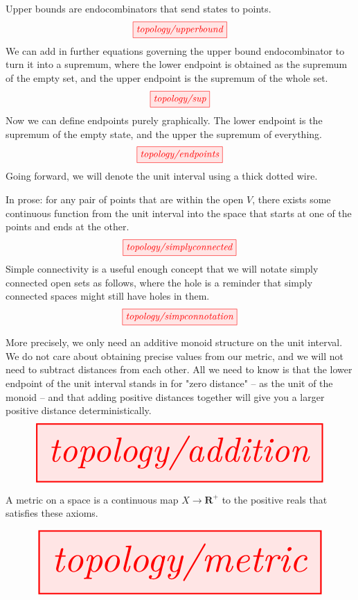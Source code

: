 \begin{myboxR}
\begin{defn}\label{defn:bounds}
Upper bounds are endocombinators that send states to points.
\[\tikzfig{topology/upperbound}\]
We can add in further equations governing the upper bound endocombinator to turn it into a supremum, where the lower endpoint is obtained as the supremum of the empty set, and the upper endpoint is the supremum of the whole set.
\[\tikzfig{topology/sup}\]
Now we can define endpoints purely graphically. The lower endpoint is the supremum of the empty state, and the upper the supremum of everything.
\[\tikzfig{topology/endpoints}\]
Going forward, we will denote the unit interval using a thick dotted wire.
\end{defn}
\end{myboxR}

\begin{myboxB}
\begin{defn}\label{def:simpconn}
In prose: for any pair of points that are within the open $V$, there exists some continuous function from the unit interval into the space that starts at one of the points and ends at the other.
\[\tikzfig{topology/simplyconnected}\]
Simple connectivity is a useful enough concept that we will notate simply connected open sets as follows, where the hole is a reminder that simply connected spaces might still have holes in them.
\[\tikzfig{topology/simpconnotation}\]
\end{defn}
\end{myboxB}

\begin{myboxR}
\begin{defn}[Addition]\label{def:addition}
More precisely, we only need an additive monoid structure on the unit interval. We do not care about obtaining precise values from our metric, and we will not need to subtract distances from each other. All we need to know is that the lower endpoint of the unit interval stands in for "zero distance" -- as the unit of the monoid -- and that adding positive distances together will give you a larger positive distance deterministically.
\[\resizebox{\textwidth}{!}{\tikzfig{topology/addition}}\]
\end{defn}
\end{myboxR}

\begin{myboxB}
\begin{defn}[Metric]\label{def:metric}
A metric on a space is a continuous map $X \rightarrow \mathbf{R}^+$ to the positive reals that satisfies these axioms.
\end{defn}
\[\resizebox{\textwidth}{!}{\tikzfig{topology/metric}}\]
\end{myboxB}

